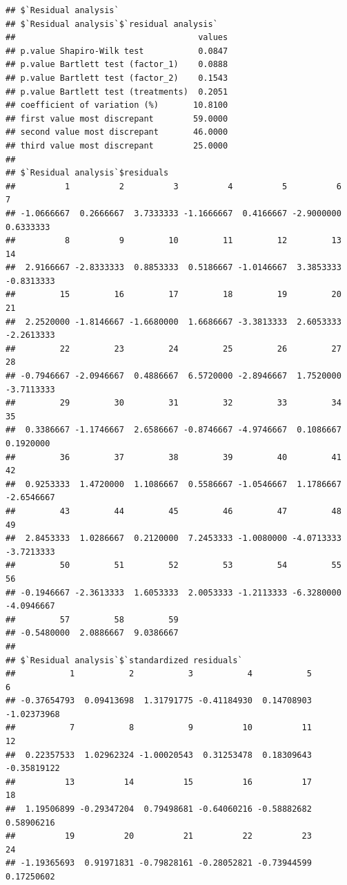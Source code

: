 \documentclass[
]{article}
\begin{document}
\begin{verbatim}
## $`Residual analysis`
## $`Residual analysis`$`residual analysis`
##                                     values
## p.value Shapiro-Wilk test           0.0847
## p.value Bartlett test (factor_1)    0.0888
## p.value Bartlett test (factor_2)    0.1543
## p.value Bartlett test (treatments)  0.2051
## coefficient of variation (%)       10.8100
## first value most discrepant        59.0000
## second value most discrepant       46.0000
## third value most discrepant        25.0000
## 
## $`Residual analysis`$residuals
##          1          2          3          4          5          6          7 
## -1.0666667  0.2666667  3.7333333 -1.1666667  0.4166667 -2.9000000  0.6333333 
##          8          9         10         11         12         13         14 
##  2.9166667 -2.8333333  0.8853333  0.5186667 -1.0146667  3.3853333 -0.8313333 
##         15         16         17         18         19         20         21 
##  2.2520000 -1.8146667 -1.6680000  1.6686667 -3.3813333  2.6053333 -2.2613333 
##         22         23         24         25         26         27         28 
## -0.7946667 -2.0946667  0.4886667  6.5720000 -2.8946667  1.7520000 -3.7113333 
##         29         30         31         32         33         34         35 
##  0.3386667 -1.1746667  2.6586667 -0.8746667 -4.9746667  0.1086667  0.1920000 
##         36         37         38         39         40         41         42 
##  0.9253333  1.4720000  1.1086667  0.5586667 -1.0546667  1.1786667 -2.6546667 
##         43         44         45         46         47         48         49 
##  2.8453333  1.0286667  0.2120000  7.2453333 -1.0080000 -4.0713333 -3.7213333 
##         50         51         52         53         54         55         56 
## -0.1946667 -2.3613333  1.6053333  2.0053333 -1.2113333 -6.3280000 -4.0946667 
##         57         58         59 
## -0.5480000  2.0886667  9.0386667 
## 
## $`Residual analysis`$`standardized residuals`
##           1           2           3           4           5           6 
## -0.37654793  0.09413698  1.31791775 -0.41184930  0.14708903 -1.02373968 
##           7           8           9          10          11          12 
##  0.22357533  1.02962324 -1.00020543  0.31253478  0.18309643 -0.35819122 
##          13          14          15          16          17          18 
##  1.19506899 -0.29347204  0.79498681 -0.64060216 -0.58882682  0.58906216 
##          19          20          21          22          23          24 
## -1.19365693  0.91971831 -0.79828161 -0.28052821 -0.73944599  0.17250602 

\end{verbatim}
\end{document}
